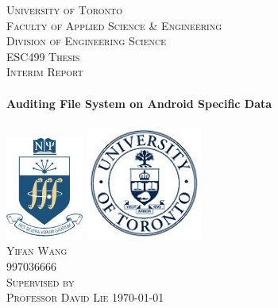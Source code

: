\begin{titlepage}
\begin{center}

\textsc{\LARGE University of Toronto}
\\[1.5cm]
\textsc{\large Faculty of Applied Science \& Engineering}
\\[0.5cm]
\textsc{\large Division of Engineering Science}
\\[0.5cm]
\textsc{\large ESC499 Thesis}
\\[1.5cm]
\textsc{\Large Interim Report}
\\[1.5cm]
\HRule
\\[0.5cm]
{ \huge \bfseries Auditing File System on Android Specific Data}
\\[0.3cm]
\HRule
\\[1.0cm]

\includegraphics[width=1.0in]{./Logos/nscilogo}
\hspace{2cm}
\includegraphics[width=1.5in]{./Logos/utorontologo}
\\[1.0cm]

\textsc{\Large Yifan Wang}
\\[0.25cm]
\textsc{\large 997036666}
\\[2.0cm]
\textsc{Supervised by}
\\[0.25cm]
\textsc{\large Professor David Lie}
\vfill
{\large \today}

\end{center}
\end{titlepage} 
